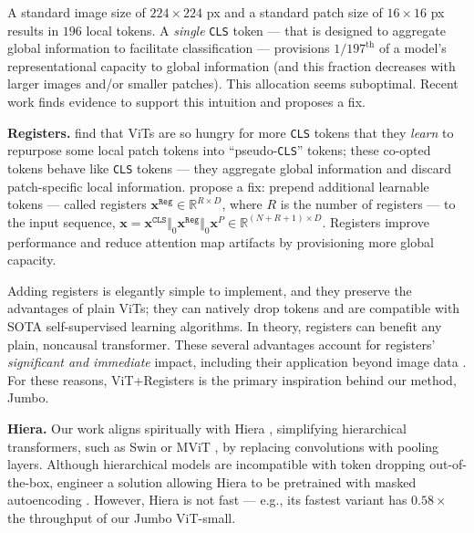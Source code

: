 A standard image size of $224\times224$ px and a standard patch size of $16\times16$ px results in $196$ local tokens. A \emph{single} \texttt{CLS} token --- that is designed to aggregate global information to facilitate classification --- provisions $1/197^{\text{th}}$ of a model's representational capacity to global information (and this fraction decreases with larger images and/or smaller patches). This allocation seems suboptimal. Recent work finds evidence to support this intuition and proposes a fix.

\textbf{Registers.} \citet{darcet2024vision} find that ViTs are so hungry for more \texttt{CLS} tokens that they \emph{learn} to repurpose some local patch tokens into ``pseudo-\texttt{CLS}'' tokens; these co-opted tokens behave like \texttt{CLS} tokens --- they aggregate global information and discard patch-specific local information. \citet{darcet2024vision} propose a fix: prepend additional learnable tokens --- called registers $\mathbf{x}^{\texttt{Reg}}\in\mathbb{R}^{R \times D}$, where $R$ is the number of registers --- to the input sequence, $\mathbf{x} = \mathbf{x}^{\texttt{CLS}} \Vert_{0} \mathbf{x}^{\texttt{Reg}} \Vert_{0} \mathbf{x}^{P} \in \mathbb{R}^{(N+R+1) \times D}$. Registers improve performance and reduce attention map artifacts by provisioning more global capacity. 

Adding registers is elegantly simple to implement, and they preserve the advantages of plain ViTs; they can natively drop tokens and are compatible with SOTA self-supervised learning algorithms. In theory, registers can benefit any plain, noncausal transformer. These several advantages account for registers' \emph{significant and immediate} impact, including their application beyond image data \cite{dong2024hymbahybridheadarchitecturesmall, vaquero2024lost, leigh2024tokenization, messaoud2025towards, hu2024fm, thimonier2024t, omranpour2024higher}. For these reasons, ViT+Registers is the primary inspiration behind our method, Jumbo.

\textbf{Hiera.} Our work aligns spiritually with Hiera \cite{ryali2023hiera}, simplifying hierarchical transformers, such as Swin \cite{liu2021swin} or MViT \cite{fan2021multiscale}, by replacing convolutions with pooling layers. Although hierarchical models are incompatible with token dropping out-of-the-box, \citet{ryali2023hiera} engineer a solution allowing Hiera to be pretrained with masked autoencoding \cite{he2022masked}. However, Hiera is not fast --- e.g., its fastest variant has $0.58 \times$ the throughput of our Jumbo ViT-small.

